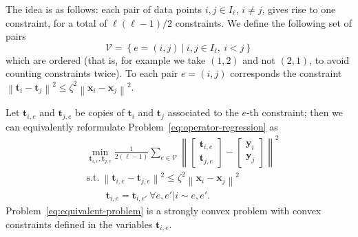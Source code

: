 \documentclass{article}
\newcommand{\norm}[1]{\left\lVert#1\right\rVert}
\newcommand{\tv}{\mathbold{t}}
\newcommand{\x}{\mathbold{x}}
\newcommand{\y}{\mathbold{y}}
\begin{document}
The idea is as follows: each pair of data points $i, j \in I_{\ell}$, $i \neq j$, gives rise to one constraint, for a total of $\ell(\ell-1)/2$ constraints. We define the following set of pairs
\begin{equation}
	\mathcal{V} = \left\{ e = (i,j) \ | \ i, j \in I_{\ell}, \ i < j \right\}
\end{equation}
which are ordered (that is, for example we take $(1,2)$ and not $(2,1)$, to avoid counting constraints twice). To each pair $e = (i,j)$ corresponds the constraint $\norm{\tv_i - \tv_j}^2 \leq \zeta^2 \norm{\x_i - \x_j}^2$.

Let $\tv_{i,e}$ and $\tv_{j,e}$ be copies of $\tv_i$ and $\tv_j$ associated to the $e$-th constraint; then we can equivalently reformulate Problem~\eqref{eq:operator-regression} as
\begin{subequations}\label{eq:equivalent-problem}
\begin{align}
	&\min_{\tv_{i,e}, \tv_{j,e}} \frac{1}{2 (\ell-1)} \sum_{e \in \mathcal{V}} \norm{\begin{bmatrix} \tv_{i,e} \\ \tv_{j,e} \end{bmatrix} - \begin{bmatrix} \y_i \\ \y_j \end{bmatrix}}^2 \\
	&\text{s.t.} \ \norm{\tv_{i,e} - \tv_{j,e}}^2 \leq \zeta^2 \norm{\x_i - \x_j}^2 \label{eq:interpolation-constraints} \\
	&\qquad \tv_{i,e} = \tv_{i,e'} \ \forall e, e' | i \sim e, e'. \label{eq:consensus-constraints}
\end{align}
\end{subequations}
Problem~\eqref{eq:equivalent-problem} is a strongly convex problem with convex constraints defined in the variables $\tv_{i,e}$.
\end{document}
